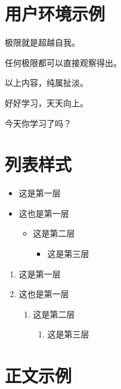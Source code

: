 \documentclass[
    10pt,
    oneside,
    openany,
    b5paper,
    colorscheme = basic  %
]{qyxf-book}
\begin{document}
\section{用户环境示例}

\begin{define}
    极限就是超越自我。
\end{define}

\begin{theorem}
    任何极限都可以直接观察得出。
\end{theorem}

\begin{lemma}
    以上内容，纯属扯淡。
\end{lemma}

\begin{note}
好好学习，天天向上。
\end{note}

\begin{alert}
今天你学习了吗？
\end{alert}

\section{列表样式}
\begin{itemize}
    \item 这是第一层
    \item 这也是第一层
    \begin{itemize}
        \item 这是第二层
        \begin{itemize}
            \item 这是第三层
        \end{itemize}
    \end{itemize}
\end{itemize}

\begin{enumerate}
    \item 这是第一层
    \item 这也是第一层
    \begin{enumerate}
        \item 这是第二层
        \begin{enumerate}
            \item 这是第三层
        \end{enumerate}
    \end{enumerate}
\end{enumerate}

\section{正文示例}
\end{document}

